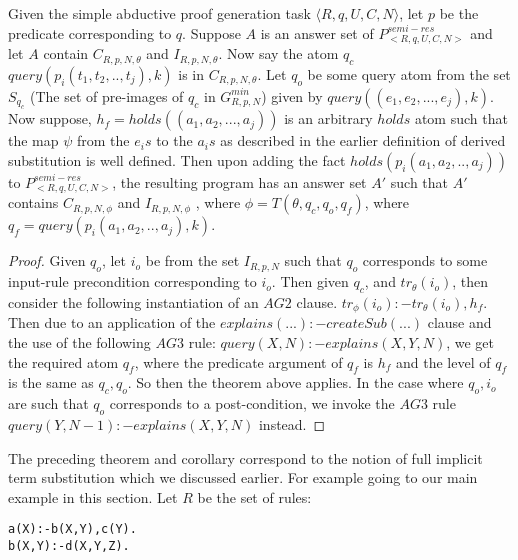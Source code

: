  
\begin{corollary}\label{addfact}
Given the simple abductive proof generation task $\langle R,q,U,C,N\rangle$, let $p$ be the predicate corresponding to $q$. Suppose $A$ is an answer set of $P^{semi-res}_{<R,q,U,C,N>}$ and let $A$ contain $C_{R,p,N,\theta}$ and $I_{R,p,N,\theta}$. Now say the atom $q_{c}$ $query(p_{i}(t_{1},t_{2},..,t_{j}),k)$ is in $C_{R,p,N,\theta}$. Let $q_{o}$ be some query atom from the set $S_{q_{c}}$ (The set of pre-images of $q_{c}$ in $G_{R,p,N}^{min}$) given by $query((e_{1},e_{2},...,e_{j}),k)$. Now suppose, $h_{f}= holds((a_{1},a_{2},...,a_{j}))$ is an arbitrary $holds$ atom such that the map $\psi$ from the $e_{i}s$ to the $a_{i}s$ as described in the earlier definition of derived substitution is well defined. Then upon adding the fact $holds(p_{i}(a_{1},a_{2},..,a_{j}))$ to $P^{semi-res}_{<R,q,U,C,N>}$, the resulting program has an answer set $A'$ such that $A'$ contains $C_{R,p,N,\phi}$ and $I_{R,p,N,\phi}$ , where $\phi = T(\theta, q_{c}, q_{o}, q_{f})$, where $q_{f} = query(p_{i}(a_{1},a_{2},..,a_{j}),k)$. 
\end{corollary}

\begin{proof} Given $q_{o}$, let $i_{o}$ be from the set $I_{R,p,N}$ such that $q_{o}$ corresponds to some input-rule precondition corresponding to $i_{o}$. Then given $q_{c}$, and $tr_{\theta}(i_{o})$, then consider the following instantiation of an $AG2$ clause. $tr_{\phi}(i_{o}):-tr_{\theta}(i_{o}),h_{f}$. Then due to an application of the $explains(...):-createSub(...)$ clause and the use of the following $AG3$ rule:
$query(X,N):-explains(X,Y,N)$, we get the required atom $q_{f}$, where the
predicate argument of $q_{f}$ is $h_{f}$ and the level of $q_{f}$ is the same as
$q_{c},q_{o}$. So then the theorem above applies. In the case where $q_{o},
i_{o}$ are such that $q_{o}$ corresponds to a post-condition, we invoke the
$AG3$ rule $query(Y,N-1):-explains(X,Y,N)$ instead.
\end{proof}

The preceding theorem and corollary correspond to the notion of full implicit term substitution which we discussed earlier. For example going to our main example in this section. Let $R$ be the set of rules:\begin{lstlisting}[frame=none]
a(X):-b(X,Y),c(Y).
b(X,Y):-d(X,Y,Z).
\end{lstlisting}

